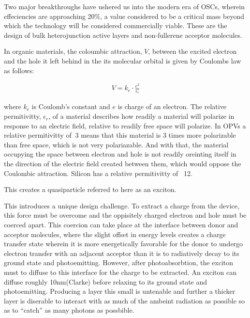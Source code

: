 Two major breakthroughs have ushered us into the modern era of OSCs, wherein effeciencies are approaching 20\%,
a value considered to be a critical mass beyond which the technology will be considered commercially viable.
These are the design of bulk heterojunction active layers and non-fullerene acceptor molecules. 

In organic materials, the coloumbic attraction, $V$,  between the excited
electron and the hole it left behind in the its molecular orbital
is given by Coulombs law as follows:

\begin{align}
    V  =  k_{e} \cdot \frac{e^{2}}{\epsilon_{r}}
\end{align}

where $k_{e}$ is Coulomb's constant and $e$ is charge of an electron. The relative permitivitty,
$\epsilon_{r}$, of a material describes how readily a material
will polarize in response to an electric field, relative to readily free space will polarize. In OPVs a
relative permitivitty of $~3$ means that this material is 3 times more polarizable than free space, which
is not very polariazable. And with that, the material occupying the space between electron and hole
is not readily oreinting itself in the direction of the electric field created between them, which would
oppose the Coulombic attraction. Silicon has a relative
permitivitty of ~12.


This creates a quasiparticle referred to here as an exciton.

This introduces a unique design challenge. 
To extract a charge from the device, this force must be overcome and the oppisitely charged electron and hole 
must be coerced apart. This coercion can take place at the interface between donor and acceptor molecules,
where the slight offset in energy levels creates a charge transfer state wherein it is more
energetically favorable for the donor to undergo electron transfer with an adjacent acceptor than
it is to radiatively decay to its ground state and photoemitting.
However, after photoabsorbtion, the exciton must to diffuse to this interface for the charge to be
extracted. An exciton can diffuse roughly 10nm(Clarke) before relaxing
to its ground state and photoemitting. Producing a layer this small is untenable and further a thicker layer
is diserable to interact with as much of the ambeint radiation as possible so as to ``catch'' as many photons
as possbible. 

